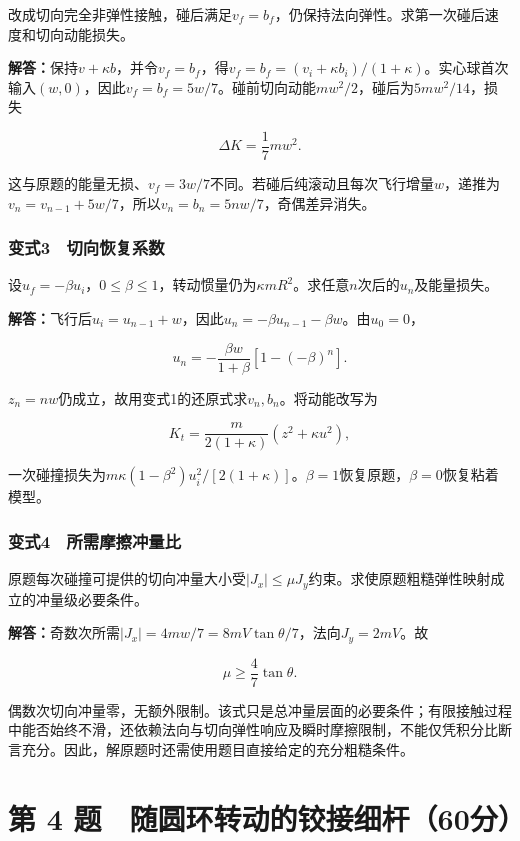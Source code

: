 \documentclass[12pt,a4paper,fontset=fandol]{ctexart}
\begin{document}
改成切向完全非弹性接触，碰后满足\(v_f=b_f\)，仍保持法向弹性。求第一次碰后速度和切向动能损失。

\textbf{解答：}保持\(v+\kappa b\)，并令\(v_f=b_f\)，得\(v_f=b_f=(v_i+\kappa b_i)/(1+\kappa)\)。实心球首次输入\((w,0)\)，因此\(v_f=b_f=5w/7\)。碰前切向动能\(mw^2/2\)，碰后为\(5mw^2/14\)，损失

\[
\Delta K=\frac17mw^2.
\]

这与原题的能量无损、\(v_f=3w/7\)不同。若碰后纯滚动且每次飞行增量\(w\)，递推为\(v_n=v_{n-1}+5w/7\)，所以\(v_n=b_n=5nw/7\)，奇偶差异消失。

\subsubsection{变式3　切向恢复系数}\label{ux53d8ux5f0f3-ux5207ux5411ux6062ux590dux7cfbux6570}

设\(u_f=-\beta u_i\)，\(0\leq\beta\leq1\)，转动惯量仍为\(\kappa mR^2\)。求任意\(n\)次后的\(u_n\)及能量损失。

\textbf{解答：}飞行后\(u_i=u_{n-1}+w\)，因此\(u_n=-\beta u_{n-1}-\beta w\)。由\(u_0=0\)，

\[
u_n=-\frac{\beta w}{1+\beta}[1-(-\beta)^n].
\]

\(z_n=nw\)仍成立，故用变式1的还原式求\(v_n,b_n\)。将动能改写为

\[
K_t=\frac{m}{2(1+\kappa)}(z^2+\kappa u^2),
\]

一次碰撞损失为\(m\kappa(1-\beta^2)u_i^2/[2(1+\kappa)]\)。\(\beta=1\)恢复原题，\(\beta=0\)恢复粘着模型。

\subsubsection{变式4　所需摩擦冲量比}\label{ux53d8ux5f0f4-ux6240ux9700ux6469ux64e6ux51b2ux91cfux6bd4}

原题每次碰撞可提供的切向冲量大小受\(\lvert J_x\rvert\leq\mu J_y\)约束。求使原题粗糙弹性映射成立的冲量级必要条件。

\textbf{解答：}奇数次所需\(\lvert J_x\rvert=4mw/7=8mV\tan\theta/7\)，法向\(J_y=2mV\)。故

\[
\mu\geq\frac47\tan\theta.
\]

偶数次切向冲量零，无额外限制。该式只是总冲量层面的必要条件；有限接触过程中能否始终不滑，还依赖法向与切向弹性响应及瞬时摩擦限制，不能仅凭积分比断言充分。因此，解原题时还需使用题目直接给定的充分粗糙条件。

\clearpage

\section{第 4
题　随圆环转动的铰接细杆（60分）}\label{ux7b2c-4-ux9898-ux968fux5706ux73afux8f6cux52a8ux7684ux94f0ux63a5ux7ec6ux674660ux5206}
\end{document}

